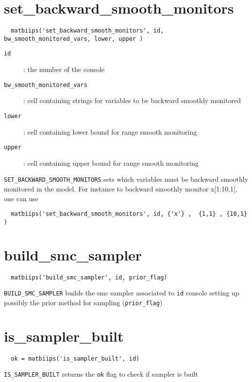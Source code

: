\documentclass[11pt,twoside]{article}
\begin{document}
\section{set\_backward\_smooth\_monitors}

 \begin{lstlisting}
  matbiips('set_backward_smooth_monitors', id, bw_smooth_monitored_vars, lower, upper )
 \end{lstlisting}

   \begin{description}
     \item[\texttt{id}]: the number of the console
     \item[\texttt{bw\_smooth\_monitored\_vars}]: cell containing strings for variables to be backward smoothly monitored
     \item[\texttt{lower}]: cell containing lower bound for range smooth monitoring
     \item[\texttt{upper}]: cell containing upper bound for range smooth monitoring

   \end{description}

   \texttt{SET\_BACKWARD\_SMOOTH\_MONITORS} sets which variables must be backward smoothly monitored in the model. For instance to backward smoothly monitor x[1:10,1], one can use
 \begin{lstlisting}
  matbiips('set_backward_smooth_monitors', id, {'x'} ,  {1,1} , {10,1} )
 \end{lstlisting}

\section{build\_smc\_sampler}

 \begin{lstlisting}
  matbiips('build_smc_sampler', id, prior_flag)
 \end{lstlisting}
  \texttt{BUILD\_SMC\_SAMPLER} builds the smc sampler associated to \texttt{id} console setting up possibly the prior method for sampling (\texttt{prior\_flag})

\section{is\_sampler\_built}

 \begin{lstlisting}
  ok = matbiips('is_sampler_built', id)
 \end{lstlisting}
  \texttt{IS\_SAMPLER\_BUILT} returns the \texttt{ok} flag to check if sampler is built
\end{document}
